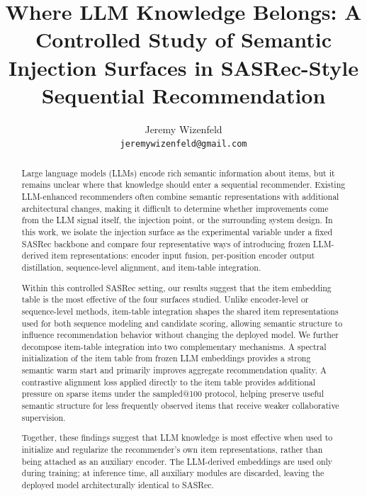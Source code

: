 \documentclass{article}
\title{Where LLM Knowledge Belongs: A Controlled Study of Semantic Injection Surfaces in SASRec-Style Sequential Recommendation}
\author{%
  Jeremy Wizenfeld \\
  \texttt{jeremywizenfeld@gmail.com} \\
}
\begin{document}
\makeatletter\renewcommand{\@notice}{}\makeatother
\maketitle
\thispagestyle{plain}

\begin{abstract}
Large language models (LLMs) encode rich semantic information about items, but it remains unclear where that knowledge should enter a sequential recommender. Existing LLM-enhanced recommenders often combine semantic representations with additional architectural changes, making it difficult to determine whether improvements come from the LLM signal itself, the injection point, or the surrounding system design. In this work, we isolate the injection surface as the experimental variable under a fixed SASRec backbone and compare four representative ways of introducing frozen LLM-derived item representations: encoder input fusion, per-position encoder output distillation, sequence-level alignment, and item-table integration.

Within this controlled SASRec setting, our results suggest that the item embedding table is the most effective of the four surfaces studied. Unlike encoder-level or sequence-level methods, item-table integration shapes the shared item representations used for both sequence modeling and candidate scoring, allowing semantic structure to influence recommendation behavior without changing the deployed model. We further decompose item-table integration into two complementary mechanisms. A spectral initialization of the item table from frozen LLM embeddings provides a strong semantic warm start and primarily improves aggregate recommendation quality. A contrastive alignment loss applied directly to the item table provides additional pressure on sparse items under the sampled@100 protocol, helping preserve useful semantic structure for less frequently observed items that receive weaker collaborative supervision.

Together, these findings suggest that LLM knowledge is most effective when used to initialize and regularize the recommender's own item representations, rather than being attached as an auxiliary encoder. The LLM-derived embeddings are used only during training; at inference time, all auxiliary modules are discarded, leaving the deployed model architecturally identical to SASRec.
\end{abstract}



\end{document}
